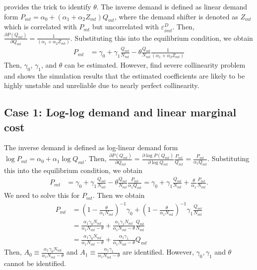 \documentclass[11pt]{article}
\begin{document}
\cite{bresnahan1982oligopoly} provides the trick to identify $\theta$. The inverse demand is defined as linear demand form $P_{mt}=\alpha_0+(\alpha_1+\alpha_2 Z_{mt}) Q_{mt}$, where the demand shifter is denoted as $Z_{mt}$ which is correlated with $P_{mt}$ but uncorrelated with $\varepsilon_{imt}^D$. Then, $\frac{\partial P\left(Q_{m t}\right)}{\partial Q_{mt}}=\frac{1}{(\alpha_1+\alpha_2 Z_{mt})}$. Substituting this into the equilibrium condition, we obtain
\begin{align*}
    P_{m t}&=\gamma_0+\gamma_1 \frac{Q_{mt}}{N_{mt}}-\theta \frac{Q_{mt}}{N_{mt}}\frac{1}{(\alpha_1+\alpha_2 Z_{mt})}
\end{align*}
Then, $\gamma_0$, $\gamma_1$, and $\theta$ can be estimated. However,  \cite{perloff2012collinearity} find severe collinearity problem and shows the simulation results that the estimated coefficients are likely to be highly unstable and unreliable due to nearly perfect collinearity.

\subsection{Case 1: Log-log demand and linear marginal cost}
The inverse demand is defined as log-linear demand form $\log P_{mt}=\alpha_0+\alpha_1 \log Q_{mt}$. Then, $\frac{\partial P\left(Q_{m t}\right)}{\partial Q_{mt}}=\frac{\partial \log P\left(Q_{m t}\right)}{\partial \log Q_{mt}}\frac{P_{mt}}{Q_{mt}}=\frac{P_{mt}}{\alpha_1 Q_{mt}}$. Substituting this into the equilibrium condition, we obtain
    \begin{align}
        P_{m t}&=\gamma_0+\gamma_1 \frac{Q_{mt}}{N_{mt}}-\theta \frac{Q_{mt}}{N_{mt}}\frac{P_{mt}}{\alpha_1 Q_{mt}}=\gamma_0+\gamma_1 \frac{Q_{mt}}{N_{mt}}+ \frac{\theta}{\alpha_1}\frac{P_{mt}}{N_{mt}}.
    \end{align}
    We need to solve this for $P_{mt}$. Then we obtain
    \begin{align*}
        P_{m t}&=\left(1-\frac{\theta}{\alpha_1 N_{mt}}\right)^{-1}\gamma_0+\left(1-\frac{\theta}{\alpha_1 N_{mt}}\right)^{-1}\gamma_1 \frac{Q_{mt}}{N_{mt}}\\ 
        & =\frac{\alpha_1 \gamma_0 N_{mt}}{\alpha_1 N_{mt}-\theta}+\frac{\alpha_1 \gamma_1 N_{mt}}{\alpha_1 N_{mt}-\theta} \frac{Q_{mt}}{N_{mt}}\\
        & =\frac{\alpha_1 \gamma_0 N_{mt}}{\alpha_1 N_{mt}-\theta}+\frac{\alpha_1 \gamma_1}{\alpha_1 N_{mt}-\theta} Q_{mt}
    \end{align*}
    Then, $A_0\equiv\frac{\alpha_1 \gamma_0 N_{mt}}{\alpha_1 N_{mt}-\theta}$ and $A_1\equiv\frac{\alpha_1 \gamma_1}{\alpha_1 N_{mt}-\theta}$ are identified. However, $\gamma_0,\gamma_1$ and $\theta$ cannot be identified. 
\end{document}
